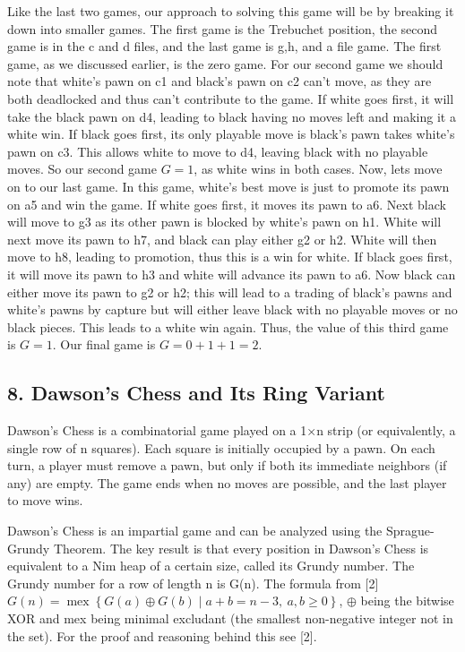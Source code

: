 \indent Like the last two games, our approach to solving this game will be by breaking it down into smaller games. The first game is the Trebuchet position, the second game is in the c and d files, and the last game is g,h, and a file game. The first game, as we discussed earlier, is the zero game. For our second game we should note that white's pawn on c1 and black's pawn on c2 can't move, as they are both deadlocked and thus can't contribute to the game. If white goes first, it will take the black pawn on d4, leading to black having no moves left and making it a white win. If black goes first, its only playable move is black's pawn takes white's pawn on c3. This allows white to move to d4, leaving black with no playable moves. So our second game $G = 1$, as white wins in both cases. Now, lets move on to our last game. In this game, white's best move is just to promote its pawn on a5 and win the game. If white goes first, it moves its pawn to a6. Next black will move to g3 as its other pawn is blocked by white's pawn on h1. White will next move its pawn to h7, and black can play either g2 or h2. White will then move to h8, leading to promotion, thus this is a win for white. If black goes first, it will move its pawn to h3 and white will advance its pawn to a6. Now black can either move its pawn to g2 or h2; this will lead to a trading of black's pawns and white's pawns by capture but will either leave black with no playable moves or no black pieces. This leads to a white win again. Thus, the value of this third game is $G=1$. Our final game is $G = 0+1+1 = 2$. 

\begin{center}
\section*{8. Dawson's Chess and Its Ring Variant}
\end{center}

\indent Dawson's Chess is a combinatorial game played on a 1×n strip (or equivalently, a single row of n squares). Each square is initially occupied by a pawn. On each turn, a player must remove a pawn, but only if both its immediate neighbors (if any) are empty. The game ends when no moves are possible, and the last player to move wins. 
\vspace{0.5em}

\indent Dawson's Chess is an impartial game and can be analyzed using the Sprague-Grundy Theorem. The key result is that every position in Dawson's Chess is equivalent to a Nim heap of a certain size, called its Grundy number. The Grundy number for a row of length n is G(n). The formula from [2] $G(n) = \operatorname{mex} \left\{ G(a) \oplus G(b) \mid a + b = n - 3,\ a, b \geq 0 \right\}$, $\oplus$ being the bitwise XOR and mex being minimal excludant (the smallest non-negative integer not in the set). For the proof and reasoning behind this see [2]. 
\vspace{0.5em}

